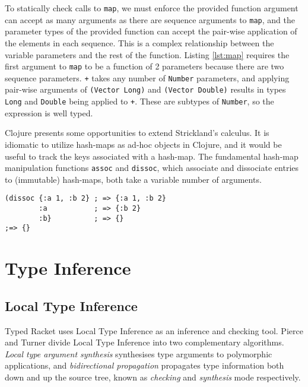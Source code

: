 To statically check calls to \lstinline|map|, we must enforce the provided function argument can accept as many
arguments as there are sequence arguments to \lstinline|map|, and the parameter types of the provided function can accept
the pair-wise application of the elements in each sequence. This is a complex relationship between the variable parameters and
the rest of the function.
Listing \ref{lst:map} requires the first argument to \lstinline|map| to be a function of 2 parameters because
there are two sequence parameters. \lstinline|+| takes any number of \lstinline|Number| parameters, 
and applying pair-wise arguments of \lstinline|(Vector Long)| and \lstinline|(Vector Double)| 
results in types \lstinline|Long| and \lstinline|Double| being applied to \lstinline|+|. These are subtypes
of \lstinline|Number|, so the expression is well typed.

Clojure presents some opportunities to extend Strickland's calculus. It is idiomatic
to utilize hash-maps as ad-hoc objects in Clojure, and it would be useful to track the keys associated
with a hash-map.  The fundamental hash-map manipulation functions \lstinline|assoc| and \lstinline|dissoc|,
which associate and dissociate entries to (immutable) hash-maps, both take a variable number of arguments.

\begin{lstlisting}[caption=Using \lstinline|dissoc| with variable arguments, label=lst:assoc1]
(dissoc {:a 1, :b 2} ; => {:a 1, :b 2}
        :a           ; => {:b 2}
        :b}          ; => {}
;=> {}
\end{lstlisting}

\section{Type Inference}

\subsection{Local Type Inference}

Typed Racket uses Local Type Inference \cite{PT00}
as an inference and checking tool. Pierce and Turner
\cite{PT00} divide Local Type Inference into
two complementary algorithms. \emph{Local type argument synthesis}
synthesises type arguments to polymorphic applications, and \emph{bidirectional
propagation} propagates type information both down and up the source tree,
known as \emph{checking} and \emph{synthesis} mode respectively.

